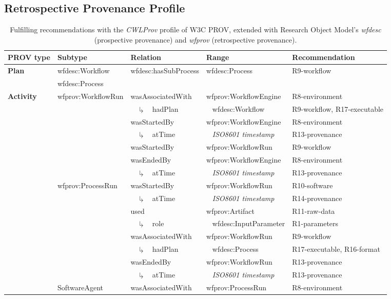 \documentclass[a4paper,num-refs]{oup-contemporary}
\newcommand{\return}{$\drsh$ ~}
\newcommand{\nary}[1]{
 ~ \return #1
}
\newcommand{\placeholder}[1]{
 \textit{#1}
}
\begin{document}
\subsection{Retrospective Provenance Profile}\label{sec:provenanceprofile}
\begin{table}[!htbp]
\caption{Fulfilling recommendations with the \textit{CWLProv} profile of W3C PROV, extended with Research Object Model's \textit{wfdesc} (prospective provenance) and \textit{wfprov} (retrospective provenance). }\label{tab:provProfile}

\begin{tabularx}{\linewidth}{l l l l L}
\toprule
PROV type & Subtype & Relation & Range & Recommendation \\
\midrule
\textbf{Plan} & wfdesc:Workflow & wfdesc:hasSubProcess & wfdesc:Process & R9-workflow\\
& wfdesc:Process & & \\
\textbf{Activity} & wfprov:WorkflowRun & wasAssociatedWith &
wfprov:WorkflowEngine & R8-environment\\
 & & \nary{hadPlan} & ~ wfdesc:Workflow & R9-workflow, R17-executable \\
 & & wasStartedBy & wfprov:WorkflowEngine & R8-environment \\
 & & \nary{atTime} & ~ \placeholder{ISO8601 timestamp}  & R13-provenance \\
 & & wasStartedBy & wfprov:WorkflowRun & R9-workflow \\
 & & wasEndedBy & wfprov:WorkflowEngine & R8-environment \\
 & & \nary{atTime} & ~ \placeholder{ISO8601 timestamp} & R13-provenance \\
 & wfprov:ProcessRun & wasStartedBy & wfprov:WorkflowRun & R10-software \\
 & & \nary{atTime} & ~ \placeholder{ISO8601 timestamp} & R14-provenance\\
 & & used & wfprov:Artifact & R11-raw-data \\
 & & \nary{role} & ~ wfdesc:InputParameter & R1-parameters \\
 & & wasAssociatedWith & wfprov:WorkflowRun & R9-workflow \\
 & & \nary{hadPlan} & ~ wfdesc:Process & R17-executable, R16-format \\
 & & wasEndedBy & wfprov:WorkflowRun & R13-provenance \\
 & & \nary{atTime} & ~ \placeholder{ISO8601 timestamp} & R13-provenance \\
 & SoftwareAgent & wasAssociatedWith & wfprov:ProcessRun & R8-environment

\end{tabularx}
\end{table}
\end{document}
